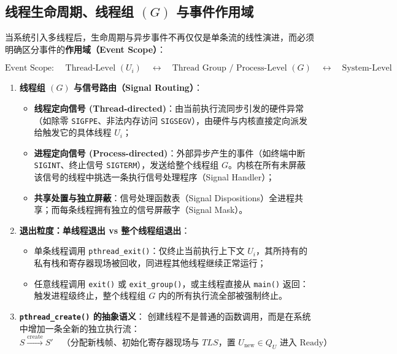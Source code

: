 \documentclass[11pt,a4paper]{ctexart}
\newcommand{\kw}[1]{\textbf{#1}}
\newcommand{\code}[1]{\texttt{#1}}
\begin{document}
\subsection{线程生命周期、线程组 \texorpdfstring{$(G)$}{(G)} 与事件作用域}

当系统引入多线程后，生命周期与异步事件不再仅仅是单条流的线性演进，而必须明确区分事件的\kw{作用域（Event Scope）}：

\[
\boxed{\text{Event Scope: }\quad \text{Thread-Level } (U_i) \quad\longleftrightarrow\quad \text{Thread Group / Process-Level } (G) \quad\longleftrightarrow\quad \text{System-Level}}
\]

\begin{enumerate}
\item \kw{线程组 $(G)$ 与信号路由（Signal Routing）}：
  \begin{itemize}
    \item \kw{线程定向信号 (Thread-directed)}：由当前执行流同步引发的硬件异常（如除零 \code{SIGFPE}、非法内存访问 \code{SIGSEGV}），由硬件与内核直接定向派发给触发它的具体线程 $U_i$；
    \item \kw{进程定向信号 (Process-directed)}：外部异步产生的事件（如终端中断 \code{SIGINT}、终止信号 \code{SIGTERM}），发送给整个线程组 $G$。内核在所有未屏蔽该信号的线程中挑选一条执行信号处理程序（Signal Handler）；
    \item \kw{共享处置与独立屏蔽}：信号处理函数表（Signal Dispositions）全进程共享；而每条线程拥有独立的信号屏蔽字（Signal Mask）。
  \end{itemize}

\item \kw{退出粒度：单线程退出 vs 整个线程组退出}：
  \begin{itemize}
    \item 单条线程调用 \code{pthread\_exit()}：仅终止当前执行上下文 $U_i$，其所持有的私有栈和寄存器现场被回收，同进程其他线程继续正常运行；
    \item 任意线程调用 \code{exit()} 或 \code{exit\_group()}，或主线程直接从 \code{main()} 返回：触发进程级终止，整个线程组 $G$ 内的所有执行流全部被强制终止。
  \end{itemize}

\item \kw{\code{pthread\_create()} 的抽象语义}：
  创建线程不是普通的函数调用，而是在系统中增加一条全新的独立执行流：
  \[
  S \xrightarrow{\text{create}} S' \quad \text{（分配新栈帧、初始化寄存器现场与 } TLS\text{，置 } U_{\text{new}} \in Q_U\text{ 进入 Ready）}
  \]


\end{enumerate}
\end{document}
